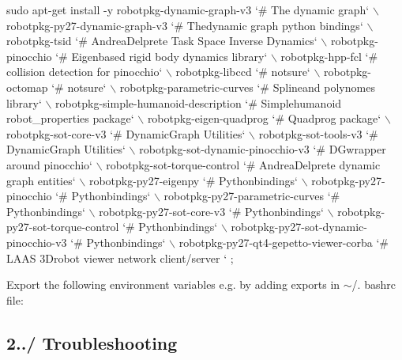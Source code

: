 \begin{DoxyCode}
sudo apt-\textcolor{keyword}{get} install -y robotpkg-dynamic-graph-v3 `# The dynamic graph` \(\backslash\)
                        robotpkg-py27-dynamic-graph-v3 `# Thedynamic graph python bindings` \(\backslash\)
                        robotpkg-tsid `# AndreaDelprete Task Space Inverse Dynamics` \(\backslash\)
                        robotpkg-pinocchio `# Eigenbased rigid body dynamics library` \(\backslash\)
                        robotpkg-hpp-fcl `# collision detection \textcolor{keywordflow}{for} pinocchio` \(\backslash\)
                        robotpkg-libccd `# notsure` \(\backslash\)
                        robotpkg-octomap `# notsure` \(\backslash\)
                        robotpkg-parametric-curves `# Splineand polynomes library` \(\backslash\)
                        robotpkg-simple-humanoid-description `# Simplehumanoid robot\_properties package` \(\backslash\)
                        robotpkg-eigen-quadprog `# Quadprog package` \(\backslash\)
                        robotpkg-sot-core-v3 `# DynamicGraph Utilities` \(\backslash\)
                        robotpkg-sot-tools-v3 `# DynamicGraph Utilities` \(\backslash\)
                        robotpkg-sot-dynamic-pinocchio-v3 `# DGwrapper around pinocchio` \(\backslash\)
                        robotpkg-sot-torque-control `# AndreaDelprete dynamic graph entities` \(\backslash\)
                        robotpkg-py27-eigenpy `# Pythonbindings` \(\backslash\)
                        robotpkg-py27-pinocchio `# Pythonbindings` \(\backslash\)
                        robotpkg-py27-parametric-curves `# Pythonbindings` \(\backslash\)
                        robotpkg-py27-sot-core-v3 `# Pythonbindings` \(\backslash\)
                        robotpkg-py27-sot-torque-control `# Pythonbindings` \(\backslash\)
                        robotpkg-py27-sot-dynamic-pinocchio-v3 `# Pythonbindings` \(\backslash\)
                        robotpkg-py27-qt4-gepetto-viewer-corba `# LAAS 3Drobot viewer network client/server
      ` ;
\end{DoxyCode}


Export the following environment variables e.\+g. by adding exports in $\sim$/. bashrc file\+:


\hypertarget{subpage_installation_install_subsec_troubleshooting}{}\subsection{2../ Troubleshooting}\label{subpage_installation_install_subsec_troubleshooting}

